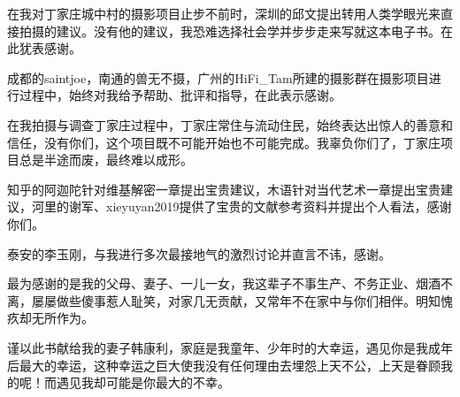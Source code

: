 \begin{acknowledgement}

  在我对丁家庄城中村的摄影项目止步不前时，深圳的邱文提出转用人类学眼光来直接拍摄的建议。没有他的建议，我恐难选择社会学并步步走来写就这本电子书。在此犹表感谢。
  
  成都的saintjoe，南通的兽无不摄，广州的HiFi\_Tam所建的摄影群在摄影项目进行过程中，始终对我给予帮助、批评和指导，在此表示感谢。

  在我拍摄与调查丁家庄过程中，丁家庄常住与流动住民，始终表达出惊人的善意和信任，没有你们，这个项目既不可能开始也不可能完成。我辜负你们了，丁家庄项目总是半途而废，最终难以成形。
  
  知乎的阿迦陀针对维基解密一章提出宝贵建议，木语针对当代艺术一章提出宝贵建议，河里的谢军、xieyuyan2019提供了宝贵的文献参考资料并提出个人看法，感谢你们。

  泰安的李玉刚，与我进行多次最接地气的激烈讨论并直言不讳，感谢。

  最为感谢的是我的父母、妻子、一儿一女，我这辈子不事生产、不务正业、烟酒不离，屡屡做些傻事惹人耻笑，对家几无贡献，又常年不在家中与你们相伴。明知愧疚却无所作为。
  
  谨以此书献给我的妻子韩康利，家庭是我童年、少年时的大幸运，遇见你是我成年后最大的幸运，这种幸运之巨大使我没有任何理由去埋怨上天不公，上天是眷顾我的呢！而遇见我却可能是你最大的不幸。

\end{acknowledgement}
